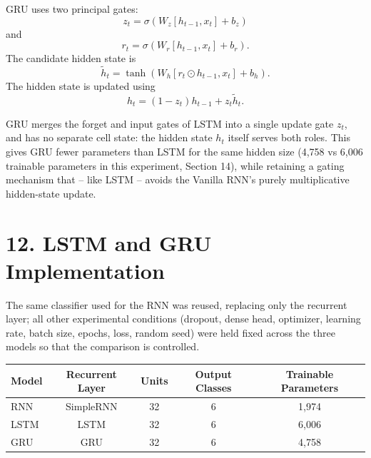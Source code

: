 \documentclass[10pt]{article}
\begin{document}
GRU uses two principal gates:
\[
z_t=\sigma(W_z[h_{t-1},x_t]+b_z)
\]
and
\[
r_t=\sigma(W_r[h_{t-1},x_t]+b_r).
\]
The candidate hidden state is
\[
\tilde{h}_t=
\tanh(W_h[r_t\odot h_{t-1},x_t]+b_h).
\]
The hidden state is updated using
\[
h_t=(1-z_t)h_{t-1}+z_t\tilde{h}_t.
\]

\begin{center}
\end{center}

GRU merges the forget and input gates of LSTM into a single update gate
$z_t$, and has no separate cell state: the hidden state $h_t$ itself serves
both roles. This gives GRU fewer parameters than LSTM for the same hidden
size (4{,}758 vs 6{,}006 trainable parameters in this experiment, Section
14), while retaining a gating mechanism that -- like LSTM -- avoids the
Vanilla RNN's purely multiplicative hidden-state update.

\section*{12. LSTM and GRU Implementation}

The same classifier used for the RNN was reused, replacing only the
recurrent layer; all other experimental conditions (dropout, dense head,
optimizer, learning rate, batch size, epochs, loss, random seed) were held
fixed across the three models so that the comparison is controlled.

\begin{center}
\begin{tabular}{|l|c|c|c|c|}
\hline
Model & Recurrent Layer & Units & Output Classes & Trainable Parameters\\
\hline
RNN & SimpleRNN & 32 & 6 & 1{,}974\\
LSTM & LSTM & 32 & 6 & 6{,}006\\
GRU & GRU & 32 & 6 & 4{,}758\\
\hline
\end{tabular}
\end{center}
\end{document}
